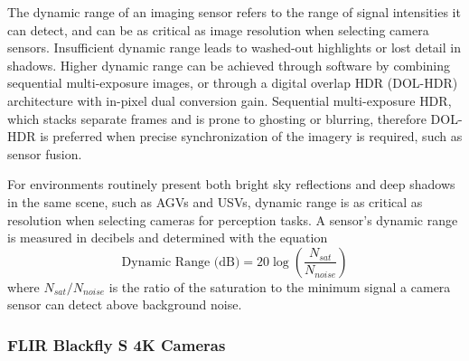 \documentclass{erauthesis}
\begin{document}


The dynamic range of an imaging sensor refers to the range of signal intensities it can detect, and can be as critical as image resolution when selecting camera sensors.
Insufficient dynamic range leads to washed-out highlights or lost detail in shadows.
Higher dynamic range can be achieved through software by combining sequential multi-exposure images, or through a digital overlap \ac{HDR} (DOL-HDR) architecture with in-pixel dual conversion gain.
Sequential multi-exposure \ac{HDR}, which stacks separate frames and is prone to ghosting or blurring, therefore 
DOL-\ac{HDR} is preferred when precise synchronization of the imagery is required, such as sensor fusion.

For environments routinely present both bright sky reflections and deep shadows in the same scene, such as \acp{AGV} and \acp{USV}, dynamic range is as critical as resolution when selecting cameras for perception tasks.
A sensor's dynamic range is measured in decibels and determined with the equation
\begin{equation}
 \text{Dynamic Range (dB)} = 20 \log{\left( \frac{N_{sat}}{N_{noise}}\right) }
\end{equation}
where $N_{sat}/N_{noise}$ is the ratio of the saturation to the minimum signal a camera sensor can detect above background noise.
\subsubsection{FLIR Blackfly S 4K Cameras} \label{sensors_FLIR}
\end{document}
